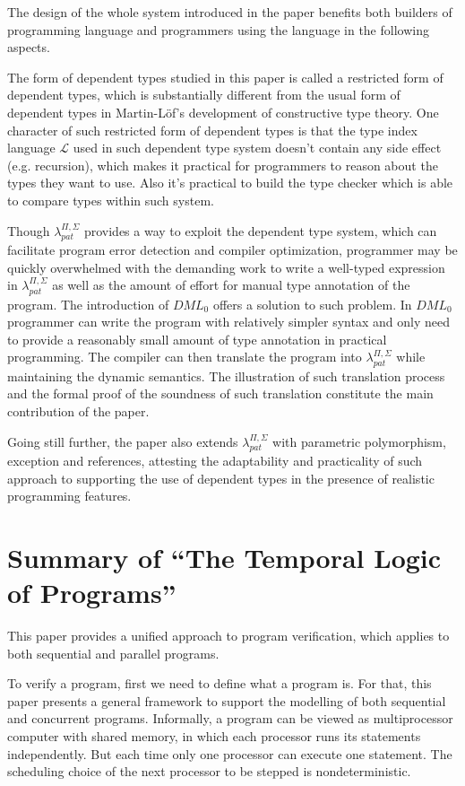 \documentclass{llncs}
\newcommand{\dmlL}{$\mathcal{L}$}
\newcommand{\dmllamall}{$\lambda_{pat}^{\Pi,\Sigma}$}
\newcommand{\dmlzero}{$DML_0$}
\begin{document}
The design of the whole system introduced in the paper benefits both builders of
programming language and programmers using the language in the following
aspects.

The form of dependent
types studied in this paper is called a restricted form of dependent types,
which is substantially different from the usual form of dependent types in
Martin-L\"of's development of constructive type theory. One character of such
restricted form of dependent types is that the type index language
\dmlL{} used in such dependent type system doesn't contain any side
effect (e.g. recursion), which makes it practical for
programmers to reason about the types they want to use. Also it's practical
to build the type checker which is able to compare types within such system.

Though \dmllamall{} provides a way to exploit the dependent type system, 
which can facilitate program error detection and
compiler optimization, programmer may be quickly overwhelmed with the
demanding work to write a well-typed expression in \dmllamall{} as well as the
amount of effort for manual type annotation of the program. The introduction
of \dmlzero{} offers a solution to such problem. In \dmlzero{} programmer can write the
program with relatively simpler syntax and only need to provide a reasonably
small amount of type annotation in practical programming. The compiler can
then translate the program into \dmllamall{} while maintaining the dynamic
semantics. The illustration of such translation process and the formal proof
of the soundness of such translation constitute the main contribution of
the paper.

Going still further, the paper also extends \dmllamall{} with 
parametric polymorphism, exception
and references, attesting the adaptability and practicality of such approach
to supporting the use of dependent types in the presence of realistic
programming features.


\newpage 
\section{Summary of ``The Temporal Logic of Programs''
  \cite{Pnueli1977Temporal}}
  \label{section:LTL}
This paper provides a unified approach to program verification, which applies
to both sequential and parallel programs.

To verify a program, first we need to define what a program is. For that,
this paper presents a general framework to support the modelling of both
sequential and concurrent programs. Informally, a program can be viewed as
multiprocessor computer with shared memory, in which each processor runs its
statements independently. But each time only one processor can execute
one statement. The scheduling choice of the next processor to be stepped
is nondeterministic.
\end{document}
